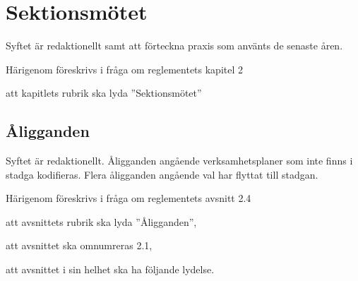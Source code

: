 \documentclass{article}
\begin{document}
\section{Sektionsmötet}
Syftet är redaktionellt samt att förteckna praxis som använts de senaste åren.

Härigenom föreskrivs i fråga om reglementets kapitel 2

\begin{dels}
    \item att kapitlets rubrik ska lyda ''Sektionsmötet''
\end{dels}

\subsection{Åligganden}
Syftet är redaktionellt.
Åligganden angående verksamhetsplaner som inte finns i stadga kodifieras.
Flera åligganden angående val har flyttat till stadgan.

Härigenom föreskrivs i fråga om reglementets avsnitt 2.4

\begin{dels}
    \item att avsnittets rubrik ska lyda ''Åligganden'',
    \item att avsnittet ska omnumreras 2.1,
    \item att avsnittet i sin helhet ska ha följande lydelse.
\end{dels}
\end{document}
